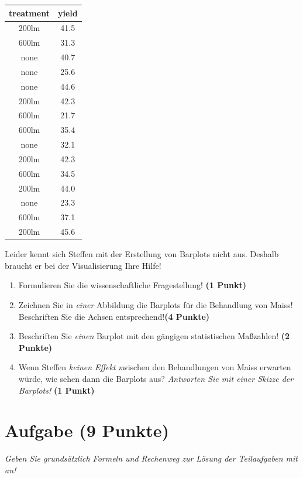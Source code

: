 \documentclass[a4paper, 9pt]{scrartcl}\usepackage[]{graphicx}\usepackage[]{xcolor}
\begin{document}
\begin{table}[!h]
\centering
\begin{tabular}{cc}
\toprule
treatment & yield\\
\midrule
200lm & 41.5\\
600lm & 31.3\\
none & 40.7\\
none & 25.6\\
none & 44.6\\
\addlinespace
200lm & 42.3\\
600lm & 21.7\\
600lm & 35.4\\
none & 32.1\\
200lm & 42.3\\
\addlinespace
600lm & 34.5\\
200lm & 44.0\\
none & 23.3\\
600lm & 37.1\\
200lm & 45.6\\
\bottomrule
\end{tabular}
\end{table}



Leider kennt sich Steffen mit der Erstellung von Barplots nicht aus. Deshalb braucht er bei der Visualisierung Ihre Hilfe!

\begin{enumerate}
\item Formulieren Sie die wissenschaftliche Fragestellung! \textbf{(1 Punkt)}
\item Zeichnen Sie in \textit{einer} Abbildung die Barplots für die Behandlung von Maiss! Beschriften Sie die Achsen entsprechend!\textbf{(4 Punkte)}
\item Beschriften Sie \textit{einen} Barplot mit den gängigen statistischen Maßzahlen! \textbf{(2 Punkte)}
\item Wenn Steffen \textit{keinen Effekt} zwischen den Behandlungen von Maiss erwarten würde, wie sehen dann die Barplots aus? \textit{Antworten Sie mit einer Skizze der Barplots!}
  \textbf{(1 Punkt)}
\end{enumerate} 
\clearpage

\section{Aufgabe \hfill (9 Punkte)}

\textit{Geben Sie grundsätzlich Formeln und Rechenweg zur Lösung der Teilaufgaben mit an!} \\[1Ex]
 
\end{document}

